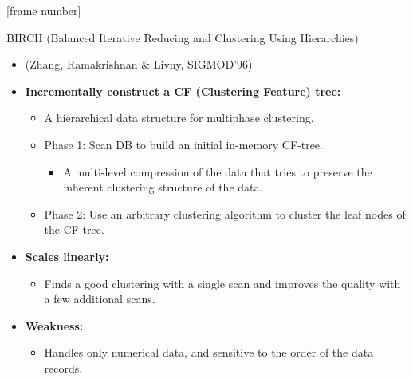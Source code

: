 \documentclass[aspectratio=169,t,xcolor=dvipsnames]{beamer}
\begin{document}
  { %
    [frame number]
    \begin{frame}{BIRCH (Balanced Iterative Reducing and Clustering Using Hierarchies)}
      \begin{itemize}
        \item (Zhang, Ramakrishnan \& Livny, SIGMOD'96)
        \item \textbf{Incrementally construct a CF (Clustering Feature) tree:}
        \begin{itemize}
          \item A hierarchical data structure for multiphase clustering.
          \item Phase 1: Scan DB to build an initial in-memory CF-tree.
          \begin{itemize}
            \item A multi-level compression of the data that tries to preserve the inherent clustering structure of the data.
          \end{itemize}
          \item Phase 2: Use an arbitrary clustering algorithm to cluster the leaf nodes of the CF-tree.
        \end{itemize}
        \item \textbf{Scales linearly:}
        \begin{itemize}
          \item Finds a good clustering with a single scan and improves the quality with a few additional scans.
        \end{itemize}
        \item \textbf{Weakness:}
        \begin{itemize}
          \item Handles only numerical data, and sensitive to the order of the data records.
        \end{itemize}
      \end{itemize}
    \end{frame}
  }
\end{document}
